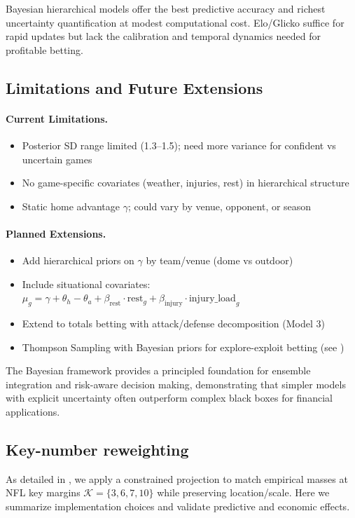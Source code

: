 Bayesian hierarchical models offer the best predictive accuracy and richest uncertainty quantification at modest computational cost. Elo/Glicko suffice for rapid updates but lack the calibration and temporal dynamics needed for profitable betting.

\subsection{Limitations and Future Extensions}

\paragraph{Current Limitations.}
\begin{itemize}
  \item Posterior SD range limited (1.3--1.5); need more variance for confident vs uncertain games
  \item No game-specific covariates (weather, injuries, rest) in hierarchical structure
  \item Static home advantage $\gamma$; could vary by venue, opponent, or season
\end{itemize}

\paragraph{Planned Extensions.}
\begin{itemize}
  \item Add hierarchical priors on $\gamma$ by team/venue (dome vs outdoor)
  \item Include situational covariates: $\mu_g = \gamma + \theta_h - \theta_a + \beta_{\text{rest}} \cdot \text{rest}_g + \beta_{\text{injury}} \cdot \text{injury\_load}_g$
  \item Extend to totals betting with attack/defense decomposition (Model 3)
  \item Thompson Sampling with Bayesian priors for explore-exploit betting (see )
\end{itemize}

The Bayesian framework provides a principled foundation for ensemble integration and risk-aware decision making, demonstrating that simpler models with explicit uncertainty often outperform complex black boxes for financial applications.

\subsection{Key-number reweighting}
As detailed in , we apply a constrained projection to match empirical masses at NFL key margins $\mathcal{K}=\{3,6,7,10\}$ while preserving location/scale. Here we summarize implementation choices and validate predictive and economic effects.

